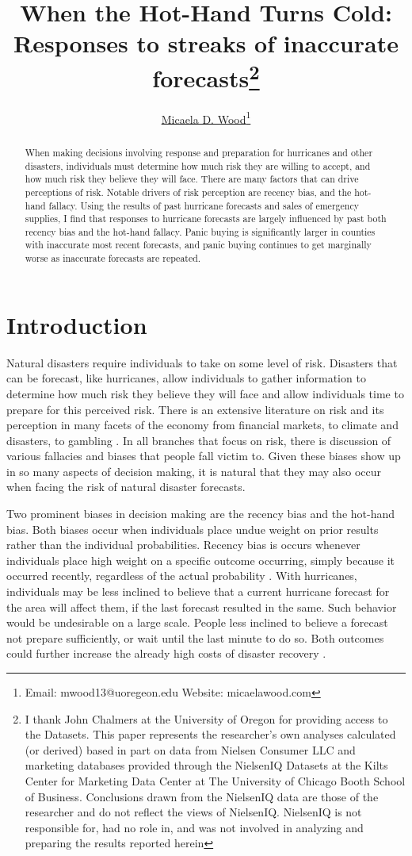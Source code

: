 \documentclass{article}
\title{When the Hot-Hand Turns Cold: Responses to streaks of inaccurate forecasts\footnote{I thank John Chalmers at the University of Oregon for providing access to the \citeauthor{Nielsen} Datasets. This paper represents the researcher's own analyses calculated (or derived) based in part on data from Nielsen Consumer LLC and marketing databases provided through the NielsenIQ Datasets at the Kilts Center for Marketing Data Center at The University of Chicago Booth School of Business. Conclusions drawn from the NielsenIQ data are those of the researcher and do not reflect the views of NielsenIQ. NielsenIQ is not responsible for, had no role in, and was not involved in analyzing and preparing the results reported herein}}
\author{\href{https://www.micaelawood.com/}{Micaela D. Wood}\footnote{Email: mwood13@uoregeon.edu Website: micaelawood.com}}
\begin{document}
\maketitle

\begin{abstract}
When making decisions involving response and preparation for hurricanes and other disasters, individuals must determine how much risk they are willing to accept, and how much risk they believe they will face. There are many factors that can drive perceptions of risk. Notable drivers of risk perception are recency bias, and the hot-hand fallacy. Using the results of past hurricane forecasts and sales of emergency supplies, I find that responses to hurricane forecasts are largely influenced by past both recency bias and the hot-hand fallacy. Panic buying is significantly larger in counties with inaccurate most recent forecasts, and panic buying continues to get marginally worse as inaccurate forecasts are repeated.
\end{abstract}

\section{Introduction}

Natural disasters require individuals to take on some level of risk. Disasters that can be forecast, like hurricanes, allow individuals to gather information to determine how much risk they believe they will face and allow individuals time to prepare for this perceived risk. There is an extensive literature on risk and its perception in many facets of the economy from financial markets, \citep{rigotti2005uncertainty,gokhale2015misvaluation, rabbani2020financial} to climate and disasters, \citep{gallagher2014learning, bakkensen2019flood, burke2022exposures} to gambling \citep{ladouceur1995cognitive, studer2015put, durand2021behavioral}. In all branches that focus on risk, there is discussion of various fallacies and biases that people fall victim to. Given these biases show up in so many aspects of decision making, it is natural that they may also occur when facing the risk of natural disaster forecasts. 

Two prominent biases in decision making are the recency bias and the hot-hand bias. Both biases occur when individuals place undue weight on prior results rather than the individual probabilities. Recency bias is occurs whenever individuals place high weight on a specific outcome occurring, simply because it occurred recently, regardless of the actual probability \citep{gallagher2014learning, rabbani2020financial, metz2023high, huseynov2025role}. With hurricanes, individuals may be less inclined to believe that a current hurricane forecast for the area will affect them, if the last forecast resulted in the same. Such behavior would be undesirable on a large scale. People less inclined to believe a forecast not prepare sufficiently, or wait until the last minute to do so. Both outcomes could further increase the already high costs of disaster recovery \citep{NorrisEtAl99,SattlerEtAl00,Baker11,deryugina2017fiscal,beatty2019disaster}.
\end{document}
